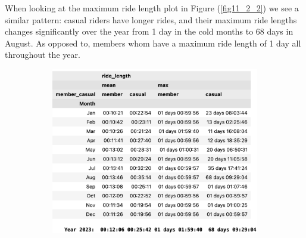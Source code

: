 \documentclass[12pt]{article}
\begin{document}
When looking at the maximum ride length plot in Figure (\underline{\ref{fig11_2_2}}) we see a similar pattern: casual riders have longer rides, and their maximum ride lengths changes significantly over the year from 1 day in the cold months to 68 days in August. As opposed to, members whom have a maximum ride length of 1 day all throughout the year. 
	\begin{figure}[h]
	\centering
		\begin{subfigure}[b]{0.55\textwidth}
   			\includegraphics[scale=0.5]{mean_max.png} 
		\end{subfigure}


\end{figure}
\end{document}
